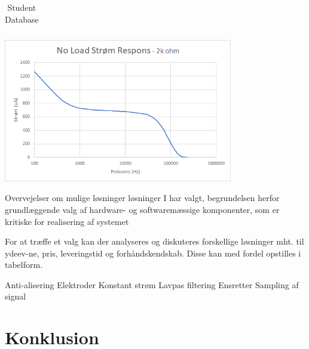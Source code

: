 \begin{table}[H]
\begin{minipage}[b]{0.30\linewidth}
\begin{tabular}{ r |  r }
\end{tabular}
    \caption{Student Database}
    \label{table:student}
\end{minipage}\hfill
\begin{minipage}[b]{0.7\linewidth}
\centering
\includegraphics[width=10cm]{Figure/stromfrekvensoprindelig2k}
\label{fig:image}
\end{minipage}
\end{table}














Overvejelser om mulige løsninger
løsninger I har valgt, begrundelsen herfor
grundlæggende valg af hardware- og softwaremæssige komponenter, som er kritiske for realisering af systemet

For at træffe et valg kan der analyseres og diskuteres forskellige løsninger mht. til ydeev-ne, pris, leveringstid og forhåndskendskab. Disse kan med fordel opstilles i tabelform.

Anti-alisering
Elektroder
Konstant strøm
Lavpas filtering
Ensretter
Sampling af signal \cite{martin}





\chapter{Konklusion}



